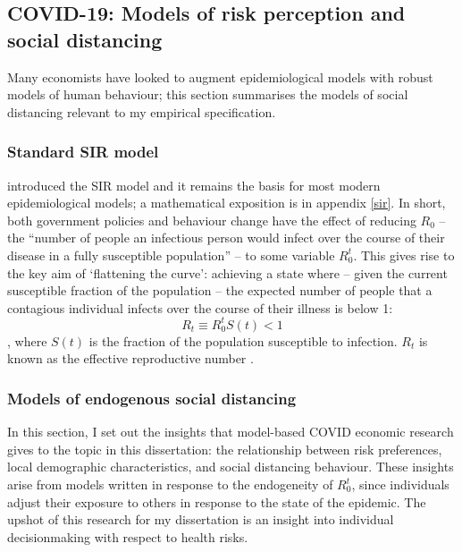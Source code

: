 \documentclass[12pt,a4]{article}
\begin{document}
\subsection{COVID-19: Models of risk perception and social distancing} 
Many economists have looked to augment epidemiological models with robust models of human behaviour; this section summarises the models of social distancing relevant to my empirical specification.
\subsubsection{Standard SIR model}
\textcite{kermackContributionMathematicalTheory1927} introduced the SIR model and it remains the basis for most modern epidemiological models; a mathematical exposition is in appendix \ref{sir}.  In short, both government policies and behaviour change have the effect of reducing \(R_0\) -- the ``number of people an infectious person would infect over the course of their disease in a fully susceptible population'' \parencite[81]{averyEconomistGuideEpidemiology2020} -- to some variable \(R^t_0\). This gives rise to the key aim of `flattening the curve': achieving a state where -- given the current susceptible fraction of the population -- the expected number of people that a contagious individual infects over the course of their illness is below 1:
\begin{equation}
    R_t \equiv R^t_0 S(t) < 1
\end{equation}, where \(S(t)\) is the fraction of the population susceptible to infection. \(R_t\) is known as the effective reproductive number \parencite{averyEconomistGuideEpidemiology2020}.

 

\subsubsection{Models of endogenous social distancing}
In this section, I set out the insights that model-based COVID economic research gives to the topic in this dissertation: the relationship between risk preferences, local demographic characteristics, and social distancing behaviour. These insights arise from models written in response to the endogeneity of \(R^t_0\), since individuals adjust their exposure to others in response to the state of the epidemic. The upshot of this research for my dissertation is an insight into individual decisionmaking with respect to health risks. 
\end{document}
